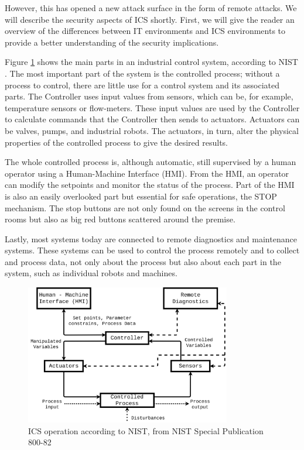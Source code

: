 However, this has opened a new attack surface in the form of remote attacks. We will describe the security aspects of ICS shortly. First, we will give the reader an overview of the differences between IT environments and ICS environments to provide a better understanding of the security implications.


Figure \ref{fig:nist_ics} shows the main parts in an industrial control system, according to NIST \cite{stouffer2011sp}. The most important part of the system is the controlled process; without a process to control, there are little use for a control system and its associated parts. The Controller uses input values from sensors, which can be, for example, temperature sensors or flow-meters. These input values are used by the Controller to calculate commands that the Controller then sends to actuators. Actuators can be valves, pumps, and industrial robots. The actuators, in turn, alter the physical properties of the controlled process to give the desired results. 

The whole controlled process is, although automatic, still supervised by a human operator using a Human-Machine Interface (HMI).
From the HMI, an operator can modify the setpoints and monitor the status of the process. Part of the HMI is also an easily overlooked part but essential for safe operations, the STOP mechanism. The stop buttons are not only found on the screens in the control rooms but also as big red buttons scattered around the premise. 

Lastly, most systems today are connected to remote diagnostics and maintenance systems. These systems can be used to control the process remotely and to collect and process data, not only about the process but also about each part in the system, such as individual robots and machines. 

\begin{figure}[h]
\centering
\includegraphics[width=0.8\textwidth]{images/NIST_800.png}
\caption{ICS operation according to NIST, from NIST Special Publication 800-82}
\label{fig:nist_ics}
\end{figure}

